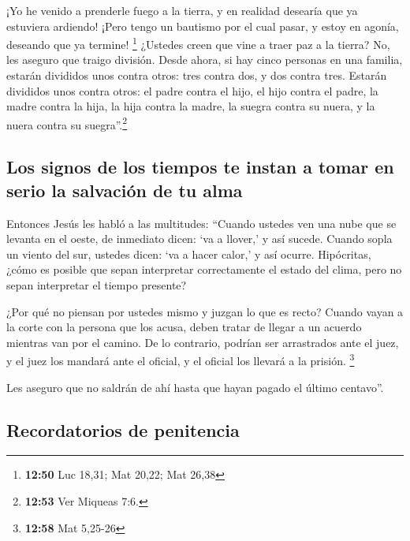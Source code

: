  ¡Yo he venido a prenderle fuego a la tierra, y en
realidad desearía que ya estuviera ardiendo!  ¡Pero tengo
un bautismo por el cual pasar, y estoy en agonía, deseando que ya
termine! \footnote{\textbf{12:50} Luc 18,31; Mat 20,22; Mat 26,38}
 ¿Ustedes creen que vine a traer paz a la tierra? No, les
aseguro que traigo división.  Desde ahora, si hay cinco
personas en una familia, estarán divididos unos contra otros: tres
contra dos, y dos contra tres.  Estarán divididos unos
contra otros: el padre contra el hijo, el hijo contra el padre, la madre
contra la hija, la hija contra la madre, la suegra contra su nuera, y la
nuera contra su suegra''.\footnote{\textbf{12:53} Ver Miqueas 7:6.}

\hypertarget{los-signos-de-los-tiempos-te-instan-a-tomar-en-serio-la-salvaciuxf3n-de-tu-alma}{%
\subsection{Los signos de los tiempos te instan a tomar en serio la
salvación de tu
alma}\label{los-signos-de-los-tiempos-te-instan-a-tomar-en-serio-la-salvaciuxf3n-de-tu-alma}}

 Entonces Jesús les habló a las multitudes: ``Cuando
ustedes ven una nube que se levanta en el oeste, de inmediato dicen: `va
a llover,' y así sucede.  Cuando sopla un viento del sur,
ustedes dicen: `va a hacer calor,' y así ocurre. 
Hipócritas, ¿cómo es posible que sepan interpretar correctamente el
estado del clima, pero no sepan interpretar el tiempo presente?

 ¿Por qué no piensan por ustedes mismo y juzgan lo que es
recto?  Cuando vayan a la corte con la persona que los
acusa, deben tratar de llegar a un acuerdo mientras van por el camino.
De lo contrario, podrían ser arrastrados ante el juez, y el juez los
mandará ante el oficial, y el oficial los llevará a la prisión.
\footnote{\textbf{12:58} Mat 5,25-26}

 Les aseguro que no saldrán de ahí hasta que hayan pagado
el último centavo''.

\hypertarget{recordatorios-de-penitencia}{%
\subsection{Recordatorios de
penitencia}\label{recordatorios-de-penitencia}}

